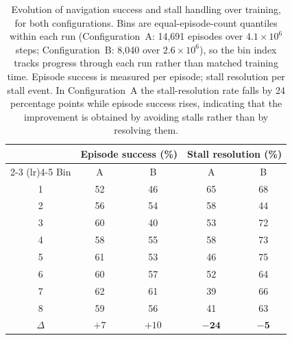 %
%
%
%

\begin{table}[ht]
\caption{Evolution of navigation success and stall handling over training, for both
configurations. Bins are equal-episode-count quantiles within each run (Configuration~A:
14{,}691 episodes over $4.1\times10^{6}$ steps; Configuration~B: 8{,}040 over
$2.6\times10^{6}$), so the bin index tracks progress through each run rather than matched
training time. Episode success is measured per episode; stall resolution per stall event. In
Configuration~A the stall-resolution rate falls by 24 percentage points while episode success
rises, indicating that the improvement is obtained by avoiding stalls rather than by resolving
them.}
\label{tab:recovery}
\begin{center}
\begin{tabular}{c cc cc}
\toprule
 & \multicolumn{2}{c}{Episode success (\%)} & \multicolumn{2}{c}{Stall resolution (\%)} \\
\cmidrule(lr){2-3} \cmidrule(lr){4-5}
Bin & A & B & A & B \\
\midrule
1 & 52 & 46 & 65 & 68 \\
2 & 56 & 54 & 58 & 44 \\
3 & 60 & 40 & 53 & 72 \\
4 & 58 & 55 & 58 & 73 \\
5 & 61 & 53 & 46 & 75 \\
6 & 60 & 57 & 52 & 64 \\
7 & 62 & 61 & 39 & 66 \\
8 & 59 & 56 & 41 & 63 \\
\midrule
$\Delta$ & $+7$ & $+10$ & $\mathbf{-24}$ & $\mathbf{-5}$ \\
\bottomrule
\end{tabular}
\end{center}
\end{table}

